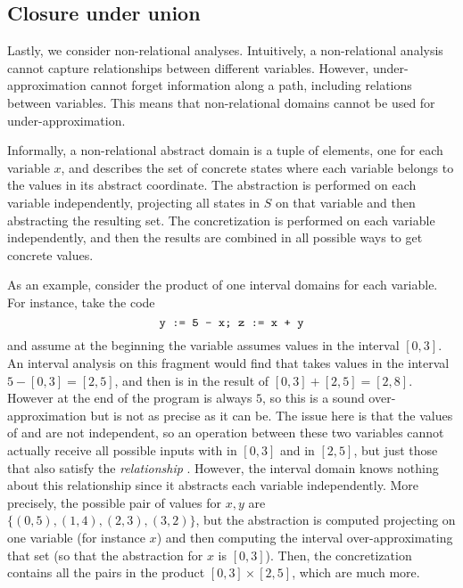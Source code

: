 \subsection*{Closure under union}
Lastly, we consider non-relational analyses. Intuitively, a non-relational analysis cannot capture relationships between different variables. However, under-approximation cannot forget information along a path, including relations between variables. This means that non-relational domains cannot be used for under-approximation.

\begin{example}
	Informally, a non-relational abstract domain is a tuple of elements, one for each variable $x$, and describes the set of concrete states where each variable belongs to the values in its abstract coordinate. The abstraction is performed on each variable independently, projecting all states in $S$ on that variable and then abstracting the resulting set. The concretization is performed on each variable independently, and then the results are combined in all possible ways to get concrete values.

	As an example, consider the product of one interval domains for each variable. For instance, take the code
	\[
	\texttt{y := 5 - x; z := x + y}
	\]
	and assume at the beginning the variable  assumes values in the interval $[0, 3]$. An interval analysis on this fragment would find that  takes values in the interval $5 - [0, 3] = [2, 5]$, and then  is in the result of $[0, 3] + [2, 5] = [2, 8]$. However at the end of the program  is always $5$, so this is a sound over-approximation but is not as precise as it can be.
	The issue here is that the values of  and  are not independent, so an operation between these two variables cannot actually receive all possible inputs with  in $[0, 3]$ and  in $[2, 5]$, but just those that also satisfy the \textit{relationship} . However, the interval domain knows nothing about this relationship since it abstracts each variable independently. More precisely, the possible pair of values for $x, y$ are $\{ (0, 5), (1, 4), (2, 3), (3, 2) \}$, but the abstraction is computed projecting on one variable (for instance $x$) and then computing the interval over-approximating that set (so that the abstraction for $x$ is $[0, 3]$). Then, the concretization contains all the pairs in the product $[0, 3] \times [2, 5]$, which are much more.


\end{example}
